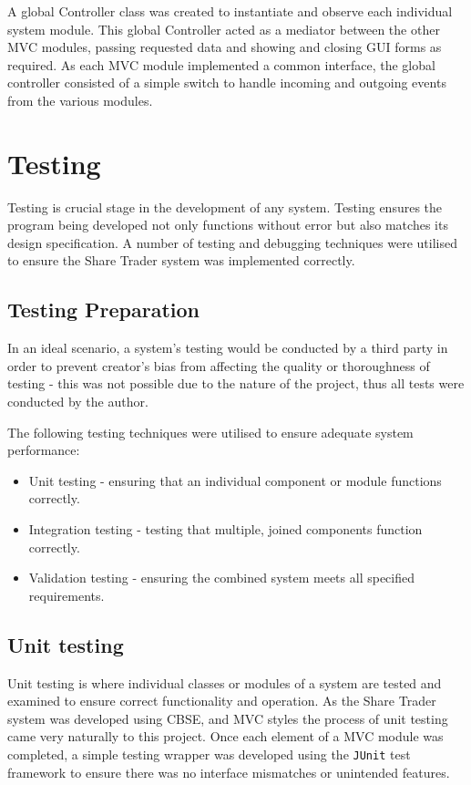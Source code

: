 \documentclass[12pt, a4paper,titlepage]{article}
\begin{document}
A global Controller class was created to instantiate and observe each
individual system module. 
This global Controller acted as a mediator between the other MVC modules,
passing requested data and showing and closing GUI forms as required.  
As each MVC module implemented a common interface, the global controller
consisted of a simple switch to handle incoming and outgoing events from the
various modules.


\section{Testing}
Testing is crucial stage in the development of any system.
Testing ensures the program being developed not only functions without error
but also matches its design specification. 
A number of testing and debugging techniques were utilised to ensure the Share
Trader system was implemented correctly.

\subsection{Testing Preparation}
In an ideal scenario, a system’s testing would be conducted by a third party
in order to prevent creator's bias from affecting the quality or thoroughness
of testing - this was not possible due to the nature of the project, thus all
tests were conducted by the author.

The following testing techniques were utilised to ensure adequate system
performance:
\begin{itemize}
    \item Unit testing - ensuring that an individual component or module
    functions correctly.
    \item Integration testing - testing that multiple, joined components
    function correctly.
    \item Validation testing - ensuring the combined system meets all
    specified requirements.
\end{itemize}

\subsection{Unit testing}
Unit testing is where individual classes or modules of a system are tested and
examined to ensure correct functionality and operation. 
As the Share Trader system was developed using CBSE, and MVC styles the
process of unit testing came very naturally to this project.  
Once each element of a MVC module was completed, a simple testing wrapper was
developed  using the {\tt JUnit} test framework to ensure there was no interface
mismatches or unintended features.
\end{document}
